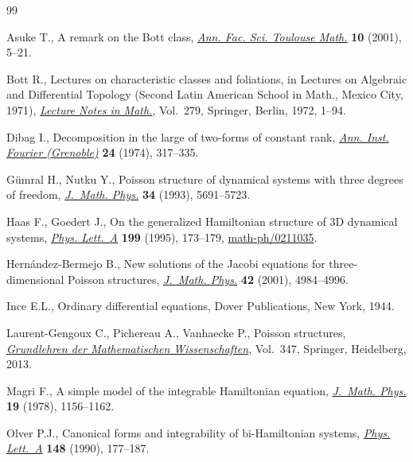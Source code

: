 \documentclass[10pt,a4paper]{amsart}
\numberwithin{equation}{section}
\begin{document}
\begin{thebibliography}{99}
\footnotesize\itemsep=0pt

Asuke T., A remark on the {B}ott class, \href{https://doi.org/10.5802/afst.981}{\textit{Ann. Fac. Sci. Toulouse Math.}}
 \textbf{10} (2001), 5--21.

Bott R., Lectures on characteristic classes and foliations, in Lectures on
 Algebraic and Dif\/ferential Topology ({S}econd {L}atin {A}merican {S}chool in
 {M}ath., {M}exico {C}ity, 1971), \href{https://doi.org/10.1007/BFb0058509}{\textit{Lecture Notes in Math.}}, Vol.~279,
 Springer, Berlin, 1972, 1--94.

Dibag I., Decomposition in the large of two-forms of constant rank,
 \href{https://doi.org/10.5802/aif.529}{\textit{Ann. Inst. Fourier (Grenoble)}} \textbf{24} (1974), 317--335.

G\"umral H., Nutku Y., Poisson structure of dynamical systems with three
 degrees of freedom, \href{https://doi.org/10.1063/1.530278}{\textit{J.~Math. Phys.}} \textbf{34} (1993), 5691--5723.

Haas F., Goedert J., On the generalized {H}amiltonian structure of {$3$}{D}
 dynamical systems, \href{https://doi.org/10.1016/0375-9601(95)00113-H}{\textit{Phys. Lett.~A}} \textbf{199} (1995), 173--179,
 \href{https://arxiv.org/abs/math-ph/0211035}{math-ph/0211035}.

Hern\'andez-Bermejo B., New solutions of the {J}acobi equations for
 three-dimensional {P}oisson structures, \href{https://doi.org/10.1063/1.1402174}{\textit{J.~Math. Phys.}} \textbf{42}
 (2001), 4984--4996.

Ince E.L., Ordinary dif\/ferential equations, Dover Publications, New York, 1944.

Laurent-Gengoux C., Pichereau A., Vanhaecke P., Poisson structures,
 \href{https://doi.org/10.1007/978-3-642-31090-4}{\textit{Grundlehren der Mathematischen Wissenschaften}}, Vol.~347, Springer,
 Heidelberg, 2013.

Magri F., A simple model of the integrable {H}amiltonian equation,
 \href{https://doi.org/10.1063/1.523777}{\textit{J.~Math. Phys.}} \textbf{19} (1978), 1156--1162.

Olver P.J., Canonical forms and integrability of bi-{H}amiltonian systems,
 \href{https://doi.org/10.1016/0375-9601(90)90775-J}{\textit{Phys. Lett.~A}} \textbf{148} (1990), 177--187.


\end{thebibliography}
\end{document}
